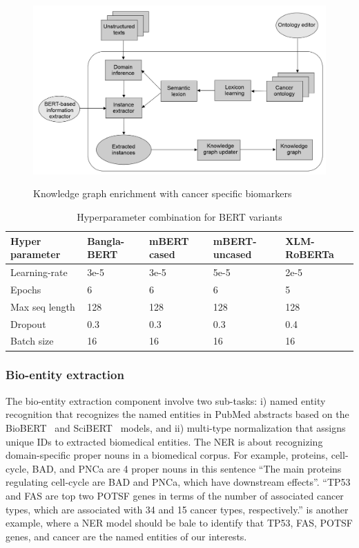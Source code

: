 \begin{figure}[h]
	\centering
		\includegraphics[scale=0.6]{images/KG_enrichment.png}
        \label{fig:kg_enrichment}
	\caption{Knowledge graph enrichment with cancer specific biomarkers}
	\vspace{-2mm}
\end{figure}

\begin{table}
    \centering
    \caption{Hyperparameter combination for BERT variants}
    \label{table:bert_params}
    \begin{tabular}{l|l|l|l|l}
        \hline
         \textbf{Hyper parameter}  & \textbf{Bangla-BERT}  &
         \textbf{mBERT cased} &
         \textbf{mBERT-uncased} & \textbf{XLM-RoBERTa}\\
        \hline
        Learning-rate  & 3e-5  & 3e-5 & 5e-5 & 2e-5 \\
        Epochs & 6 & 6 & 6 & 5 \\
        Max seq length & 128 & 128 & 128 & 128 \\
        Dropout & 0.3 & 0.3 & 0.3 & 0.4 \\
        Batch size & 16 & 16 & 16 & 16 \\
        \hline
    \end{tabular}
\end{table}

\subsubsection{Bio-entity extraction}
The bio-entity extraction component involve two sub-tasks: i) named entity recognition that recognizes the named entities in PubMed abstracts based on the BioBERT~\cite{BioBERT} and SciBERT~\cite{SciBERT} models, and ii) multi-type normalization that assigns unique IDs to extracted biomedical entities. The NER is about recognizing domain-specific proper nouns in a biomedical corpus. For example, proteins, cell-cycle, BAD, and PNCa are 4 proper nouns in this sentence ``The main proteins regulating cell-cycle are BAD and PNCa, which have downstream effects''. 
``TP53 and FAS are top two POTSF genes in terms of the number of associated cancer types, which are associated with 34 and 15 cancer types, respectively.'' is another example, where a NER model should be bale to identify that TP53, FAS, POTSF genes, and cancer are the named entities of our interests. 


